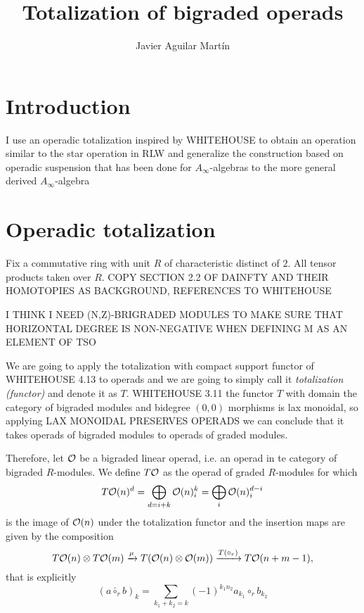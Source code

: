 \documentclass[twoside]{article}
\begin{document}
\title{Totalization of bigraded operads}
\author{Javier Aguilar Martín}
\maketitle

\section{Introduction}
I use an operadic totalization inspired by WHITEHOUSE to obtain an operation similar to the star operation in RLW and generalize the construction based on operadic suspension that has been done for $A_\infty$-algebras to the more general derived $A_\infty$-algebra


\section{Operadic totalization}
Fix a commutative ring with unit $R$ of characteristic distinct of $2$. All tensor products taken over $R$. COPY SECTION 2.2 OF DAINFTY AND THEIR HOMOTOPIES AS BACKGROUND, REFERENCES TO WHITEHOUSE

I THINK I NEED  (N,Z)-BRIGRADED MODULES TO MAKE SURE THAT HORIZONTAL DEGREE IS NON-NEGATIVE WHEN DEFINING M AS AN ELEMENT OF TSO

We are going to apply the totalization with compact support functor of WHITEHOUSE 4.13 to operads and we are going to simply call it \emph{totalization (functor)} and denote it as $T$. WHITEHOUSE 3.11 the functor $T$ with domain the category of bigraded modules and bidegree $(0,0)$ morphisms is lax monoidal, so applying LAX MONOIDAL PRESERVES OPERADS we can conclude that it takes operads of bigraded modules to operads of graded modules.  

Therefore, let ${\mathcal O}$ be a bigraded linear operad, i.e. an operad in te category  of bigraded $R$-modules. We define $T{\mathcal O}$ as the operad of graded $R$-modules for which \[T{\mathcal O}(n)^d=\bigoplus_{d=i+k} {\mathcal O}(n)^k_i=\bigoplus_i {\mathcal O}(n)^{d-i}_i\] is the image of ${\mathcal O}(n)$ under the totalization functor and the insertion maps are given by the composition  %
\[T{\mathcal O}(n)\otimes T{\mathcal O}(m)\xrightarrow{\mu} T({\mathcal O}(n)\otimes {\mathcal O}(m)) \xrightarrow{T(\circ_r)} T{\mathcal O}(n+m-1),\]
that is explicitly 
\[(a\bar{\circ}_rb)_k=\sum_{k_1+k_2=k} (-1)^{k_1n_2} a_{k_1}\circ_r b_{k_2}\]
\end{document}
